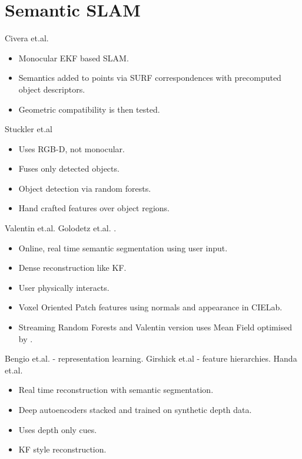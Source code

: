 \section{Semantic SLAM}
\label{sec:lit_review_semantic}
Civera et.al. \cite{Civera2011}
\begin{itemize}
	\item Monocular EKF based SLAM.
	\item Semantics added to points via SURF correspondences with precomputed object descriptors.
	\item Geometric compatibility is then tested.
\end{itemize}

Stuckler et.al \cite{Stuckler2012} 
\begin{itemize}
	\item Uses RGB-D, not monocular.
	\item Fuses only detected objects.
	\item Object detection via random forests.
	\item Hand crafted features over object regions.
\end{itemize}

Valentin et.al. \cite{Valentin2015} Golodetz et.al. \cite{Golodetz2015}.
\begin{itemize}
	\item Online, real time semantic segmentation using user input.
	\item Dense reconstruction like KF.
	\item User physically interacts.
	\item Voxel Oriented Patch features using normals and appearance in CIELab.
	\item Streaming Random Forests\cite{Abdulsalam2007}  and Valentin version uses Mean Field \cite{Xing2002} optimised by \cite{Krahenbuhl2011}.
\end{itemize}

Bengio et.al. \cite{Bengio2013} - representation learning.
Girshick et.al \cite{Girshick2014} - feature hierarchies.
Handa et.al. \cite{Handa2015}
\begin{itemize}
	\item Real time reconstruction with semantic segmentation.
	\item Deep autoencoders stacked and trained on synthetic depth data.
	\item Uses depth only cues.
	\item KF style reconstruction.
\end{itemize}

